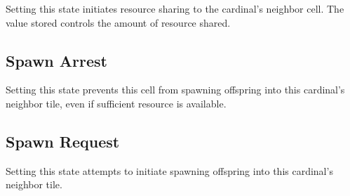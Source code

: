
Setting this state initiates resource sharing to the cardinal's neighbor cell.
The value stored controls the amount of resource shared.

\subsection{Spawn Arrest}


Setting this state prevents this cell from spawning offspring into this cardinal's neighbor tile, even if sufficient resource is available.

\subsection{Spawn Request}


Setting this state attempts to initiate spawning offspring into this cardinal's neighbor tile.
